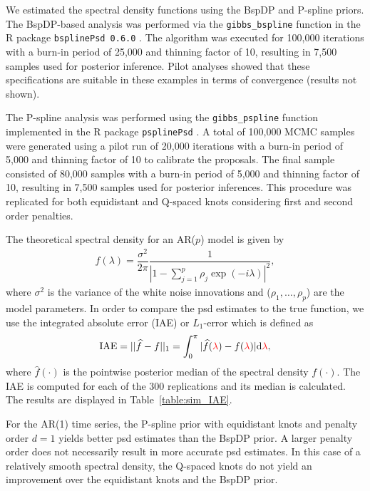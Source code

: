 \documentclass[twocolumn,final]{svjour3}
\newcommand{\pmr}{ \color{red}}
\begin{document}
We estimated the spectral density functions using the BspDP and P-spline priors.  The BspDP-based  analysis was performed via the \texttt{gibbs\_bspline} function in the \textsf{R} package \texttt{bsplinePsd{\pmr 0.6.0}} \citep{Edwards:bsplinePsd:2018}.  The algorithm was executed for 100,000 iterations with a burn-in period of 25,000 and thinning factor of 10, resulting in 7,500 samples used for posterior inference.  Pilot analyses showed that these specifications are suitable in these examples in terms of convergence (results not shown).  

The P-spline analysis was performed using the \texttt{gibbs\_pspline} function implemented in the \textsf{R} package \texttt{psplinePsd} \citep{psplinepackage}.  A total of 100,000 MCMC samples were generated
using  a pilot run of 20,000 iterations with a burn-in period of 5,000 and thinning factor of 10 to calibrate the proposals.  The final sample consisted of 80,000 samples with a burn-in period of 5,000 and thinning factor of 10, resulting in 7,500 samples used for posterior inferences.  
This procedure was replicated for both equidistant and Q-spaced knots considering first and second order penalties.

The theoretical spectral density for an AR($p$) model is given by
\begin{align*}
f(\lambda) = \dfrac{\sigma^2}{2 \pi} \dfrac{1}{|1-\sum_{j=1}^{p}\rho_j \exp(-i \lambda)|^2},
\end{align*}
where $\sigma^2$ is the variance of the white noise innovations and ($\rho_1, \dots, \rho_p$) are the model parameters.  In order to compare the psd estimates  to the true function, we use the integrated absolute error (IAE) or $L_1$-error which is defined as
\begin{align*}
\text{IAE} = || \widehat{f} - f ||_1 = \int_{0}^{\pi} |\widehat{f}(\textcolor{red}{\lambda})-f(\textcolor{red}{\lambda})|\text{d}\textcolor{red}{\lambda},
\end{align*}
where $\widehat{f}(\cdot)$ is the pointwise posterior median of the spectral density $f(\cdot)$.   The IAE is computed for each of the 300 replications and its median is calculated.  
The results are displayed in Table~\ref{table:sim_IAE}.

For the AR(1) time series, the P-spline prior with equidistant knots and penalty order $d=1$ yields better psd estimates than the BspDP prior.
A larger penalty order does not necessarily result in more accurate psd estimates. In this case of a relatively smooth spectral density, the Q-spaced knots do not yield an improvement over the equidistant knots and the BspDP prior.
\end{document}
